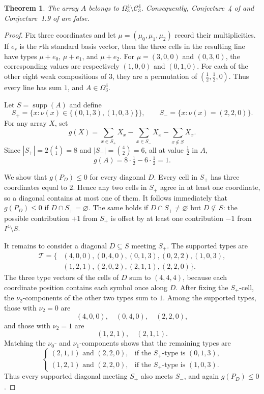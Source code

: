 \documentclass[11pt]{amsart}
\newtheorem{theorem}{Theorem}
\theoremstyle{remark}
\DeclareMathOperator{\supp}{supp}
\begin{document}
\begin{theorem}\label{thm:main}
The array $A$ belongs to $\Omega_3^4\setminus\mathcal C_3^4$. Consequently,
Conjecture~4 of \cite{Taranenko2016} and Conjecture~1.9 of
\cite{ChildWanless2020} are false.
\end{theorem}

\begin{proof}
Fix three coordinates and let $\mu=(\mu_0,\mu_1,\mu_2)$ record their
multiplicities. If $e_r$ is the $r$th standard basis vector, then the three
cells in the resulting line have types $\mu+e_0$, $\mu+e_1$, and
$\mu+e_2$. For $\mu=(3,0,0)$ and $(0,3,0)$, the corresponding values are
respectively $(1,0,0)$ and $(0,1,0)$. For each of the other eight weak
compositions of $3$, they are a permutation of
$(\tfrac12,\tfrac12,0)$. Thus every line has sum $1$, and
$A\in\Omega_3^4$.

Let $S=\supp(A)$ and define
\[
  S_+=\{x:\nu(x)\in\{(0,1,3),(1,0,3)\}\},
  \qquad
  S_-=\{x:\nu(x)=(2,2,0)\}.
\]
For any array $X$, set
\begin{equation}\label{eq:g}
  g(X)=
  \sum_{x\in S_+}X_x
  -\sum_{x\in S_-}X_x
  -\sum_{x\notin S}X_x.
\end{equation}
Since $|S_+|=2\binom41=8$ and $|S_-|=\binom42=6$, all at value
$\tfrac12$ in $A$,
\begin{equation}\label{eq:gA}
  g(A)=8\cdot\tfrac12-6\cdot\tfrac12=1.
\end{equation}

We show that $g(P_D)\leq0$ for every diagonal $D$. Every cell in $S_+$ has
three coordinates equal to $2$. Hence any two cells in $S_+$ agree in at
least one coordinate, so a diagonal contains at most one of them. It follows
immediately that $g(P_D)\leq0$ if $D\cap S_+=\varnothing$. The same holds if
$D\cap S_+\neq\varnothing$ but $D\nsubseteq S$: the possible contribution
$+1$ from $S_+$ is offset by at least one contribution $-1$ from
$I^4\setminus S$.

It remains to consider a diagonal $D\subseteq S$ meeting $S_+$. The supported
types are
\[
\begin{aligned}
\mathcal T=\{&(4,0,0),(0,4,0),(0,1,3),(0,2,2),(1,0,3),\\
              &(1,2,1),(2,0,2),(2,1,1),(2,2,0)\}.
\end{aligned}
\]
The three type vectors of the cells of $D$ sum to $(4,4,4)$, because each
coordinate position contains each symbol once along $D$. After fixing the
$S_+$-cell, the $\nu_2$-components of the other two types sum to $1$.
Among the supported types, those with $\nu_2=0$ are
\[
  (4,0,0),\quad(0,4,0),\quad(2,2,0),
\]
and those with $\nu_2=1$ are
\[
  (1,2,1),\quad(2,1,1).
\]
Matching the $\nu_0$- and $\nu_1$-components shows that the remaining types are
\[
\begin{cases}
(2,1,1)\text{ and }(2,2,0),&\text{if the $S_+$-type is }(0,1,3),\\
(1,2,1)\text{ and }(2,2,0),&\text{if the $S_+$-type is }(1,0,3).
\end{cases}
\]
Thus every supported diagonal meeting $S_+$ also meets $S_-$, and again
$g(P_D)\leq0$.


\end{proof}
\end{document}
